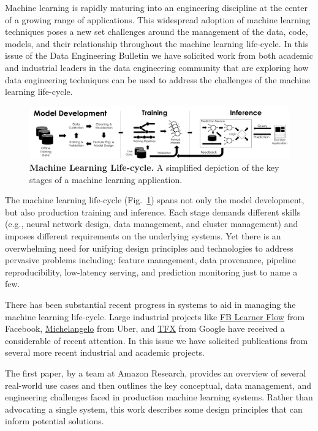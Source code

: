 \documentclass[11pt]{article}
\begin{document}
Machine learning is rapidly maturing into an engineering discipline at the center of a growing range of applications.
This widespread adoption of machine learning techniques poses a new set challenges around the management of the data, code, models, and their relationship throughout the machine learning life-cycle.
In this issue of the Data Engineering Bulletin we have solicited work from both academic and industrial leaders in the data engineering community that are exploring how data engineering techniques can be used to address the challenges of the machine learning life-cycle.




\begin{figure}[h]
\centering
\includegraphics[width=\textwidth]{letters/pipeline.pdf}
\caption{\small \textbf{Machine Learning Life-cycle.} A simplified depiction of the key stages of a machine learning application.}
\label{fig:mllc}
\end{figure}


The machine learning life-cycle (Fig.~\ref{fig:mllc}) spans not only the model development, but also production training and inference.
Each stage demands different skills (e.g., neural network design, data management, and cluster management) and imposes different requirements on the underlying systems.
Yet there is an overwhelming need for unifying design principles and technologies to address pervasive problems including: feature management, data provenance, pipeline reproducibility, low-latency serving, and prediction monitoring just to name a few.


There has been substantial recent progress in systems to aid in managing the machine learning life-cycle.  
Large industrial projects like \href{https://code.fb.com/core-data/introducing-fblearner-flow-facebook-s-ai-backbone/}{FB Learner Flow} from Facebook, \href{https://eng.uber.com/michelangelo/}{Michelangelo} from Uber, and \href{https://www.tensorflow.org/tfx/}{TFX} from Google have received a considerable of recent attention.  
In this issue we have solicited publications from several more recent industrial and academic projects.

The first paper, by a team at Amazon Research, provides an overview of several real-world use cases and then outlines the key conceptual, data management, and engineering challenges faced in production machine learning systems.
Rather than advocating a single system, this work describes some design principles that can inform potential solutions.
\end{document}
